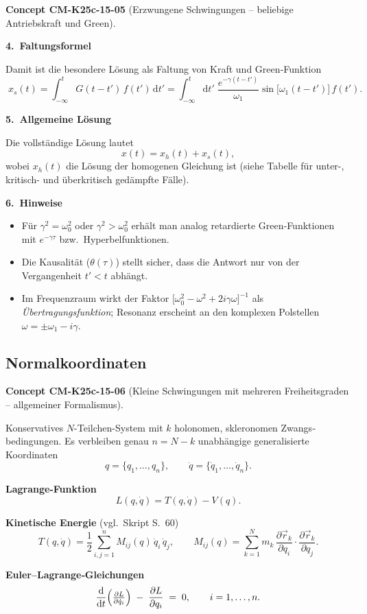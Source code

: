 \documentclass[10pt, letterpaper]{article}
\newcommand{\CustomHeading}[3]{%
  \par\medskip\noindent%
  \textbf{#1 #2} \textnormal{(#3)}.\enskip%
}
\newenvironment{CONC}[2]{\CustomHeading{Concept}{#1}{#2}}{}
\begin{document}
\begin{CONC}{CM-K25c-15-05}{Erzwungene Schwingungen – beliebige Antriebskraft und Green}
\textbf{4.\ Faltungsformel}

Damit ist die besondere Lösung als Faltung von Kraft und Green‐Funktion
\[
  \boxed{\;
    x_s(t)=
      \int_{-\infty}^{t}\!G(t-t')\,f(t')\,\mathrm dt'}
  =
  \int_{-\infty}^{t}\!
     \mathrm dt'\;
     \frac{e^{-\gamma(t-t')}}{\omega_{1}}
     \sin\bigl[\omega_{1}(t-t')\bigr]\,
     f(t').
\]

\textbf{5.\ Allgemeine Lösung}

Die vollständige Lösung lautet
\[
  x(t)=x_h(t)+x_s(t),
\]
wobei \(x_h(t)\) die Lösung der homogenen Gleichung ist  
(siehe Tabelle für unter-, kritisch- und überkritisch gedämpfte Fälle).

\textbf{6.\ Hinweise}

\begin{itemize}
  \item Für \(\gamma^{2}=\omega_{0}^{2}\) oder \(\gamma^{2}>\omega_{0}^{2}\) 
        erhält man analog retardierte Green‐Funktionen mit
        \(e^{-\gamma\tau}\) bzw.\ Hyperbelfunktionen.
  \item Die Kausalität (\(\theta(\tau)\)) stellt sicher, dass die Antwort
        nur von der Vergangenheit \(t'<t\) abhängt.
  \item Im Frequenzraum wirkt der Faktor
        \(\bigl[\omega_{0}^{2}-\omega^{2}+2i\gamma\omega\bigr]^{-1}\)
        als \emph{Übertragungsfunktion}; Resonanz erscheint an den
        komplexen Polstellen \(\omega=\pm\omega_{1}-i\gamma\).
\end{itemize}
\end{CONC}

\subsection{Normalkoordinaten}

\begin{CONC}{CM-K25c-15-06}{Kleine Schwingungen mit mehreren Freiheitsgraden – allgemeiner Formalismus}
Konservatives $N$-Teilchen-System mit $k$ holonomen, skleronomen Zwangs­bedingungen.  
Es verbleiben genau $n=N-k$ unabhängige generalisierte Koordinaten
\[
  q=\{q_1,\dots,q_n\},\qquad 
  \dot q=\{\dot q_1,\dots,\dot q_n\}.
\]

\textbf{Lagrange-Funktion}  
\[
  L(q,\dot q)=T(q,\dot q)-V(q).
\]

\textbf{Kinetische Energie}  (vgl.\ Skript S.~60)  
\[
  T(q,\dot q)=\frac12\sum_{i,j=1}^{n} M_{ij}(q)\,\dot q_i\,\dot q_j,
  \qquad
  M_{ij}(q)=\sum_{k=1}^{N}
            m_k\,
            \frac{\partial\vec r_k}{\partial q_i}\!\cdot\!
            \frac{\partial\vec r_k}{\partial q_j}.
\]

\textbf{Euler–Lagrange‐Gleichungen}  
\[
  \frac{\mathrm d}{\mathrm dt}\Bigl(\tfrac{\partial L}{\partial\dot q_i}\Bigr)
  \;-\;
  \frac{\partial L}{\partial q_i}
  \;=\;0,
  \qquad
  i=1,\dots,n.
\]
\end{CONC}
\end{document}
